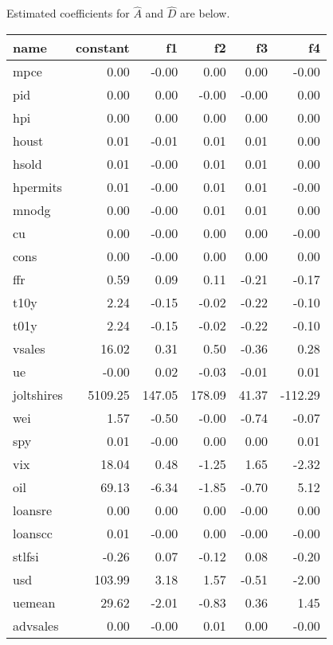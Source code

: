 \documentclass[11pt, letterpaper]{article}\usepackage[]{graphicx}\usepackage[]{color}
\begin{document}
Estimated coefficients for $\widehat{A}$ and $\widehat{D}$ are below.
\begin{table}[H]
\centering
\begingroup\footnotesize
\begin{tabular}{lrrrrr}
  \hline
name & constant & f1 & f2 & f3 & f4 \\ 
  \hline
mpce & 0.00 & -0.00 & 0.00 & 0.00 & -0.00 \\ 
  pid & 0.00 & 0.00 & -0.00 & -0.00 & 0.00 \\ 
  hpi & 0.00 & 0.00 & 0.00 & 0.00 & 0.00 \\ 
  houst & 0.01 & -0.01 & 0.01 & 0.01 & 0.00 \\ 
  hsold & 0.01 & -0.00 & 0.01 & 0.01 & 0.00 \\ 
  hpermits & 0.01 & -0.00 & 0.01 & 0.01 & -0.00 \\ 
  mnodg & 0.00 & -0.00 & 0.01 & 0.01 & 0.00 \\ 
  cu & 0.00 & -0.00 & 0.00 & 0.00 & -0.00 \\ 
  cons & 0.00 & -0.00 & 0.00 & 0.00 & 0.00 \\ 
  ffr & 0.59 & 0.09 & 0.11 & -0.21 & -0.17 \\ 
  t10y & 2.24 & -0.15 & -0.02 & -0.22 & -0.10 \\ 
  t01y & 2.24 & -0.15 & -0.02 & -0.22 & -0.10 \\ 
  vsales & 16.02 & 0.31 & 0.50 & -0.36 & 0.28 \\ 
  ue & -0.00 & 0.02 & -0.03 & -0.01 & 0.01 \\ 
  joltshires & 5109.25 & 147.05 & 178.09 & 41.37 & -112.29 \\ 
  wei & 1.57 & -0.50 & -0.00 & -0.74 & -0.07 \\ 
  spy & 0.01 & -0.00 & 0.00 & 0.00 & 0.01 \\ 
  vix & 18.04 & 0.48 & -1.25 & 1.65 & -2.32 \\ 
  oil & 69.13 & -6.34 & -1.85 & -0.70 & 5.12 \\ 
  loansre & 0.00 & 0.00 & 0.00 & -0.00 & 0.00 \\ 
  loanscc & 0.01 & -0.00 & 0.00 & -0.00 & -0.00 \\ 
  stlfsi & -0.26 & 0.07 & -0.12 & 0.08 & -0.20 \\ 
  usd & 103.99 & 3.18 & 1.57 & -0.51 & -2.00 \\ 
  uemean & 29.62 & -2.01 & -0.83 & 0.36 & 1.45 \\ 
  advsales & 0.00 & -0.00 & 0.01 & 0.00 & -0.00 \\ 

\end{tabular}
\end{table}
\end{document}
